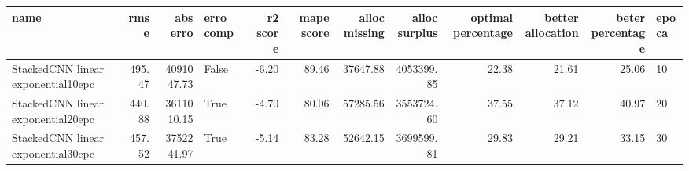 \begin{tabular}{lrrlrrrrrrrl}
\toprule
name & rmse & abs erro & erro comp & r2 score & mape score & alloc missing & alloc surplus & optimal percentage & better allocation & beter percentage & epoca \\
\midrule
StackedCNN linear exponential10epc & 495.47 & 4091047.73 & False & -6.20 & 89.46 & 37647.88 & 4053399.85 & 22.38 & 21.61 & 25.06 & 10 \\
StackedCNN linear exponential20epc & 440.88 & 3611010.15 & True & -4.70 & 80.06 & 57285.56 & 3553724.60 & 37.55 & 37.12 & 40.97 & 20 \\
StackedCNN linear exponential30epc & 457.52 & 3752241.97 & True & -5.14 & 83.28 & 52642.15 & 3699599.81 & 29.83 & 29.21 & 33.15 & 30 \\
\bottomrule
\end{tabular}

